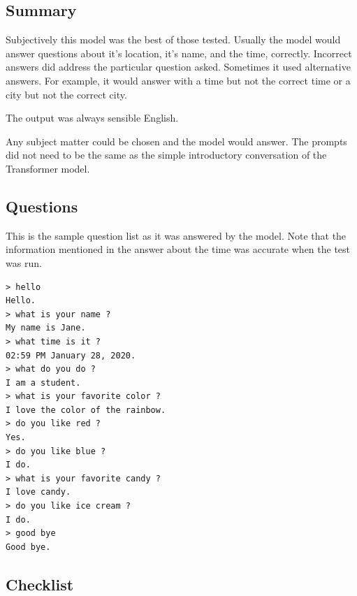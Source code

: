 \subsection{Summary}

Subjectively this model was the best of those tested. Usually the model would answer questions about it's location, it's name, and the time, correctly. %
Incorrect answers did address the particular question asked. Sometimes it used alternative answers. For example, it would answer with a time but not the correct time or a city but not the correct city.  %

The output was always sensible English. 
 
Any subject matter could be chosen and the model would answer. The prompts did not need to be the same as the simple introductory conversation of the Transformer model. 

\subsection{Questions}
This is the sample question list as it was answered by the model. Note that the information mentioned in the answer about the time was accurate when the test was run.

\begin{verbatim}
> hello
Hello.
> what is your name ?
My name is Jane.
> what time is it ?
02:59 PM January 28, 2020.
> what do you do ?
I am a student.
> what is your favorite color ?
I love the color of the rainbow.
> do you like red ?
Yes.
> do you like blue ?
I do.
> what is your favorite candy ?
I love candy.
> do you like ice cream ?
I do. 
> good bye
Good bye.
\end{verbatim}

\subsection{Checklist}

